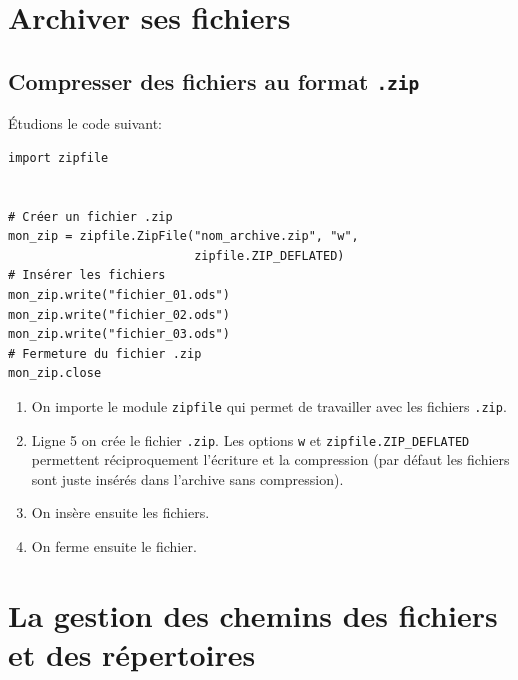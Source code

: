 \documentclass[a4paper,11pt]{book}
\begin{document}
\chapter{Archiver ses fichiers}
\section{Compresser des fichiers au format \texttt{.zip}}
Étudions le code suivant:
\begin{lstlisting}
import zipfile


# Créer un fichier .zip
mon_zip = zipfile.ZipFile("nom_archive.zip", "w", 
                          zipfile.ZIP_DEFLATED)  
# Insérer les fichiers
mon_zip.write("fichier_01.ods")
mon_zip.write("fichier_02.ods")
mon_zip.write("fichier_03.ods")
# Fermeture du fichier .zip
mon_zip.close
\end{lstlisting}
\medskip
                                                                                                                                                              
\begin{enumerate}
	\item On importe le module \texttt{zipfile} qui permet de travailler avec les fichiers \texttt{.zip}.
	\item Ligne 5 on crée le fichier \texttt{.zip}. Les options \texttt{w} et \texttt{zipfile.ZIP\_DEFLATED} permettent réciproquement l'écriture et la compression (par défaut les fichiers sont juste insérés dans l'archive sans compression).
	\item On insère ensuite les fichiers.
	\item On ferme ensuite le fichier.
\end{enumerate}                                                                                                                                                         
\medskip

\chapter{La gestion des chemins des fichiers et des répertoires}
\end{document}
